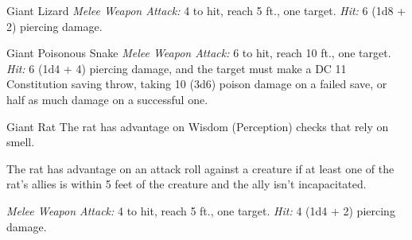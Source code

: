 \documentclass[10pt,a4paper,twoside,bg=print,twocolumn,openany,nodeprecatedcode]{dndbook}
\begin{document}
\begin{DndMonster}[float=t]{Giant Lizard}
\DndMonsterBasics[
armor-class = {12 (natural armor)},
hit-points = {\DndDice{3d10 + 3}},
speed = {30 ft., climb 30 ft.}
]
\DndMonsterAbilityScores[
 str = 15,
 dex = 12,
 con = 13,
 int = 2,
 wis = 10,
 cha = 5
]
\DndMonsterDetails[
senses = {darkvision 30 ft., passive perception 10},
challenge = 1/4,
]
\textsl{Melee Weapon Attack:} 4 to hit, reach 5 ft., one target. \textsl{Hit:} 6 (1d8 + 2) piercing damage.

\end{DndMonster}



\begin{DndMonster}[float=t]{Giant Poisonous Snake}
\DndMonsterBasics[
armor-class = {14},
hit-points = {\DndDice{2d8 + 2}},
speed = {30 ft., swim 30 ft.}
]
\DndMonsterAbilityScores[
 str = 10,
 dex = 18,
 con = 13,
 int = 2,
 wis = 10,
 cha = 3
]
\DndMonsterDetails[
skills = {Perception +2},
senses = {blindsight 10 ft., passive perception 12},
challenge = 1/4,
]
\textsl{Melee Weapon Attack:} 6 to hit, reach 10 ft., one target. \textsl{Hit:} 6 (1d4 + 4) piercing damage, and the target must make a DC 11 Constitution saving throw, taking 10 (3d6) poison damage on a failed save, or half as much damage on a successful one.

\end{DndMonster}



\begin{DndMonster}[float=t]{Giant Rat}
\DndMonsterBasics[
armor-class = {12},
hit-points = {\DndDice{2d6}},
speed = {30 ft.}
]
\DndMonsterAbilityScores[
 str = 7,
 dex = 15,
 con = 11,
 int = 2,
 wis = 10,
 cha = 4
]
\DndMonsterDetails[
senses = {darkvision 60 ft., passive perception 10},
challenge = 1/8,
]
The rat has advantage on Wisdom (Perception) checks that rely on smell.

The rat has advantage on an attack roll against a creature if at least one of the rat's allies is within 5 feet of the creature and the ally isn't incapacitated.

\textsl{Melee Weapon Attack:} 4 to hit, reach 5 ft., one target. \textsl{Hit:} 4 (1d4 + 2) piercing damage.

\end{DndMonster}
\end{document}
